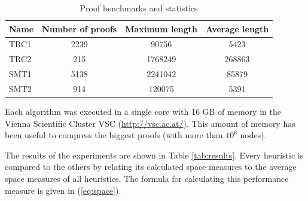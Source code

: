 \documentclass{llncs}
\begin{document}
\begin{table}[tb]
	\centering
	\begin{tabular}{l|c|c|c}
		\textbf{Name} & \textbf{Number of proofs} & \textbf{Maximum length} & \textbf{Average length} \\ \toprule
		TRC1 & 2239 & 90756   & 5423   \\ \hline
		TRC2 & 215	& 1768249 & 268863 \\ \hline
    SMT1 & 5138 & 2241042 & 85879 \\ \hline
    SMT2 & 914  & 120075  & 5391  \\     
	\end{tabular}
	\caption{Proof benchmarks and statistics}
	\label{tab:benchmarks}
\end{table}

Each algorithm was executed in a single core with 16 GB of memory 
in the Vienna Scientific Cluster VSC 
(\url{http://vsc.ac.at/}). This amount of memory has been useful to compress the biggest proofs (with more than $10^6$ nodes).

The results of the experiments are shown in Table \ref{tab:results}.
Every heuristic is compared to the others by relating its calculated space measures to the average space measures of all heuristics.
The formula for calculating this performance measure is given in (\ref{eq:space}).
\end{document}
